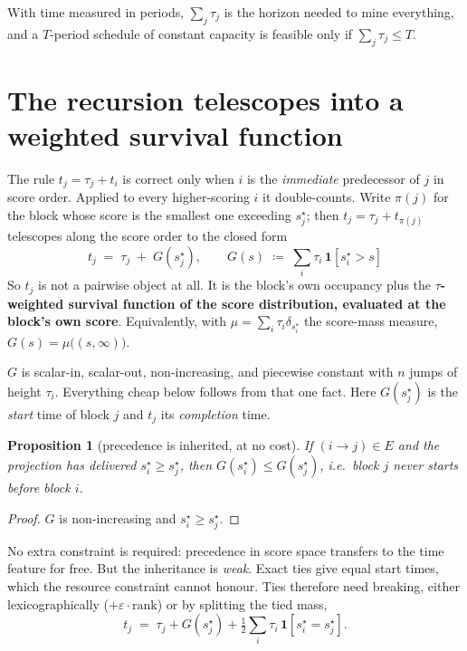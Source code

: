 \documentclass[11pt,a4paper]{article}
\newcommand{\ind}[1]{\mathbf{1}\!\left[#1\right]}
\newcommand{\sstar}{s^{\star}}
\newtheorem{proposition}{Proposition}
\theoremstyle{definition}
\begin{document}
With time measured in periods, $\sum_j \tau_j$ is the horizon needed to mine everything, and a
$T$-period schedule of constant capacity is feasible only if $\sum_j \tau_j \le T$.

\section{The recursion telescopes into a weighted survival function}

The rule $t_j = \tau_j + t_i$ is correct only when $i$ is the \emph{immediate} predecessor of $j$
in score order. Applied to every higher-scoring $i$ it double-counts. Write $\pi(j)$ for the block
whose score is the smallest one exceeding $\sstar_j$; then $t_j = \tau_j + t_{\pi(j)}$ telescopes
along the score order to the closed form
\[
  \boxed{\;
  t_j \;=\; \tau_j \;+\; G\!\left(\sstar_j\right),
  \qquad
  G(s) \;\coloneqq\; \sum_{i} \tau_i \,\ind{\sstar_i > s}
  \;}
\]
So $t_j$ is not a pairwise object at all. It is the block's own occupancy plus the
\textbf{$\tau$-weighted survival function of the score distribution, evaluated at the block's own
score}. Equivalently, with $\mu = \sum_i \tau_i \delta_{\sstar_i}$ the score-mass measure,
$G(s) = \mu\big((s,\infty)\big)$.

$G$ is scalar-in, scalar-out, non-increasing, and piecewise constant with $n$ jumps of height
$\tau_i$. Everything cheap below follows from that one fact. Here $G(\sstar_j)$ is the
\emph{start} time of block $j$ and $t_j$ its \emph{completion} time.

\begin{proposition}[precedence is inherited, at no cost]
If $(i \to j) \in E$ and the projection has delivered $\sstar_i \ge \sstar_j$, then
$G(\sstar_i) \le G(\sstar_j)$, i.e.\ block $j$ never \emph{starts} before block $i$.
\end{proposition}
\begin{proof}
$G$ is non-increasing and $\sstar_i \ge \sstar_j$.
\end{proof}

\noindent No extra constraint is required: precedence in score space transfers to the time feature
for free. But the inheritance is \emph{weak}. Exact ties give equal start times, which the
resource constraint cannot honour. Ties therefore need breaking, either lexicographically
($+\varepsilon\cdot\mathrm{rank}$) or by splitting the tied mass,
\[
  t_j \;=\; \tau_j + G(\sstar_j) + \tfrac12 \sum_i \tau_i\, \ind{\sstar_i = \sstar_j}.
\]
\end{document}
